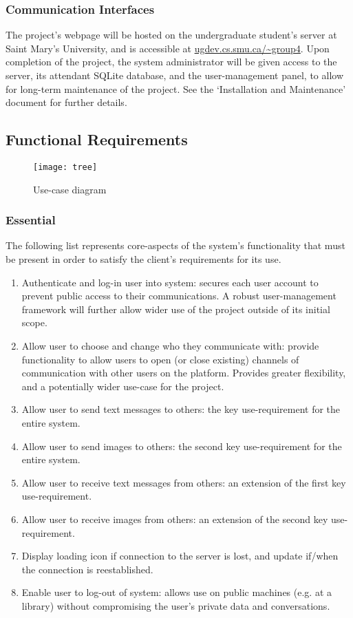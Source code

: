 \documentclass[11pt]{article}
\begin{document}
\subsubsection{Communication Interfaces}
The project's webpage will be hosted on the undergraduate student's server at Saint Mary's
University, and is accessible at \url{ugdev.cs.smu.ca/~group4}. Upon completion of the project, the
system administrator will be given access to the server, its attendant SQLite database, and the
user-management panel, to allow for long-term maintenance of the project. See the `Installation
and Maintenance' document for further details.

\subsection{Functional Requirements}

\begin{figure}[!htb]
  \centering
  \texttt{[image: tree]}
  \caption{Use-case diagram}
\end{figure}

\subsubsection{Essential}
The following list represents core-aspects of the system's functionality that must be present in
order to satisfy the client's requirements for its use.
\begin{enumerate}
    \item Authenticate and log-in user into system: secures each user account to prevent public
        access to their communications. A robust user-management framework will further allow
        wider use of the project outside of its initial scope.
    \item Allow user to choose and change who they communicate with: provide functionality to allow
        users to open (or close existing) channels of communication with other users on the
        platform. Provides greater flexibility, and a potentially wider use-case for the project.
    \item Allow user to send text messages to others: the key use-requirement for the entire system.
    \item Allow user to send images to others: the second key use-requirement for the entire system.
    \item Allow user to receive text messages from others: an extension of the first key
        use-requirement.
    \item Allow user to receive images from others: an extension of the second key use-requirement.
    \item Display loading icon if connection to the server is lost, and update if/when the
        connection is reestablished.
    \item Enable user to log-out of system: allows use on public machines (e.g. at a library)
        without compromising the user's private data and conversations.
\end{enumerate}
\end{document}
